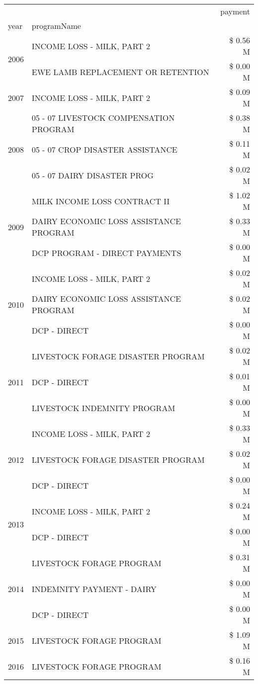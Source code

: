 \begin{tabular}{llr}
\toprule
 &  & payment \\
year & programName &  \\
\midrule
\multirow[t]{2}{*}{2006} & INCOME LOSS - MILK, PART 2 & \$ 0.56 M \\
 & EWE LAMB REPLACEMENT OR RETENTION & \$ 0.00 M \\
\cline{1-3}
2007 & INCOME LOSS - MILK, PART 2 & \$ 0.09 M \\
\cline{1-3}
\multirow[t]{3}{*}{2008} & 05 - 07 LIVESTOCK COMPENSATION PROGRAM & \$ 0.38 M \\
 & 05 - 07 CROP DISASTER ASSISTANCE & \$ 0.11 M \\
 & 05 - 07 DAIRY DISASTER PROG & \$ 0.02 M \\
\cline{1-3}
\multirow[t]{3}{*}{2009} & MILK INCOME LOSS CONTRACT II & \$ 1.02 M \\
 & DAIRY ECONOMIC LOSS ASSISTANCE PROGRAM & \$ 0.33 M \\
 & DCP PROGRAM - DIRECT PAYMENTS & \$ 0.00 M \\
\cline{1-3}
\multirow[t]{3}{*}{2010} & INCOME LOSS - MILK, PART 2 & \$ 0.02 M \\
 & DAIRY ECONOMIC LOSS ASSISTANCE PROGRAM & \$ 0.02 M \\
 & DCP - DIRECT & \$ 0.00 M \\
\cline{1-3}
\multirow[t]{3}{*}{2011} & LIVESTOCK FORAGE DISASTER PROGRAM & \$ 0.02 M \\
 & DCP - DIRECT & \$ 0.01 M \\
 & LIVESTOCK INDEMNITY PROGRAM & \$ 0.00 M \\
\cline{1-3}
\multirow[t]{3}{*}{2012} & INCOME LOSS - MILK, PART 2 & \$ 0.33 M \\
 & LIVESTOCK FORAGE DISASTER PROGRAM & \$ 0.02 M \\
 & DCP - DIRECT & \$ 0.00 M \\
\cline{1-3}
\multirow[t]{2}{*}{2013} & INCOME LOSS - MILK, PART 2 & \$ 0.24 M \\
 & DCP - DIRECT & \$ 0.00 M \\
\cline{1-3}
\multirow[t]{3}{*}{2014} & LIVESTOCK FORAGE PROGRAM & \$ 0.31 M \\
 & INDEMNITY PAYMENT - DAIRY & \$ 0.00 M \\
 & DCP - DIRECT & \$ 0.00 M \\
\cline{1-3}
2015 & LIVESTOCK FORAGE PROGRAM & \$ 1.09 M \\
\cline{1-3}
\multirow[t]{3}{*}{2016} & LIVESTOCK FORAGE PROGRAM & \$ 0.16 M \\

\end{tabular}
